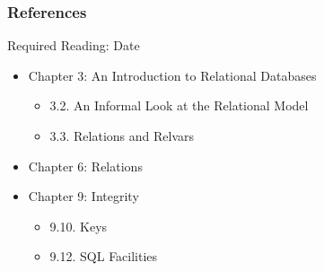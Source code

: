 \documentclass[dvipsnames]{beamer}
\theoremstyle{plain}
\begin{document}
\begin{frame}
  \frametitle{References}

  \begin{block}{Required Reading: Date}
    \begin{itemize}
      \item Chapter 3: An Introduction to Relational Databases
      \begin{itemize}
        \item 3.2. \alert{An Informal Look at the Relational Model}
        \item 3.3. \alert{Relations and Relvars}
      \end{itemize}

      \item Chapter 6: \alert{Relations}

      \item Chapter 9: Integrity
      \begin{itemize}
        \item 9.10. \alert{Keys}
        \item 9.12. \alert{SQL Facilities}
      \end{itemize}
    \end{itemize}
  \end{block}
\end{frame}
\end{document}
